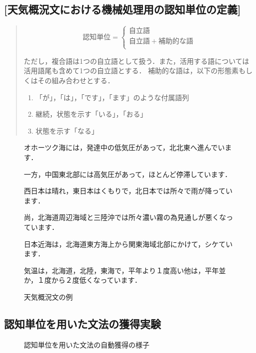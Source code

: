 \subsection*{[天気概況文における機械処理用の認知単位の定義]}
\begin{quotation}
\[
認知単位 = \left\{\begin{array}{l}自立語\\自立語+補助的な語\\\end{array}\right.
\]

ただし，複合語は1つの自立語として扱う．また，活用する語については
活用語尾も含めて1つの自立語とする．
補助的な語は，以下の形態素もしくはその組み合わせとする．

\begin{enumerate}
\item 「が」，「は」，「です」，「ます」のような付属語列
\item 継続，状態を示す「いる」，「おる」
\item 状態を示す「なる」
\end{enumerate}

\end{quotation}

\begin{figure}[t]
\scriptsize
オホーツク海には，発達中の低気圧があって，北北東へ進んでいます．

一方，中国東北部には高気圧があって，ほとんど停滞しています．

西日本は晴れ，東日本はくもりで，北日本では所々で雨が降っています．

尚，北海道周辺海域と三陸沖では所々濃い霧の為見通しが悪くなっています．

日本近海は，北海道東方海上から関東海域北部にかけて，シケています．

気温は，北海道，北陸，東海で，平年より１度高い他は，平年並か，１度から２度低くなっています．
\caption{天気概況文の例} \label{zu3}
\end{figure}

\newpage
\subsection{認知単位を用いた文法の獲得実験}
\vspace{4mm}
\begin{figure}[b]
\begin{center}

\end{center}
\caption{認知単位を用いた文法の自動獲得の様子} \label{zu4}
\end{figure}

